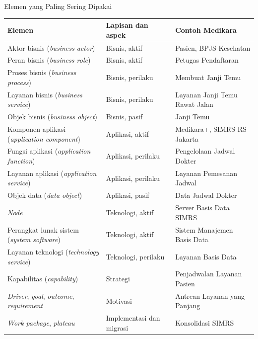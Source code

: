 \documentclass[aspectratio=169, table, 12pt]{beamer}
\begin{document}
\begin{frame}{{\Large Elemen yang Paling Sering Dipakai}}
  \scriptsize
  \begin{tabularx}{\textwidth}{>{\raggedright\arraybackslash}p{6.0cm}l
      >{\raggedright\arraybackslash}X}
    \hline
    \textbf{Elemen} & \textbf{Lapisan dan aspek} & \textbf{Contoh Medikara} \\
    \hline
    Aktor bisnis (\textit{business actor}) & Bisnis, aktif & Pasien, BPJS Kesehatan \\
    \hline
    Peran bisnis (\textit{business role}) & Bisnis, aktif & Petugas Pendaftaran \\
    \hline
    Proses bisnis (\textit{business process}) & Bisnis, perilaku & Membuat Janji Temu \\
    \hline
    Layanan bisnis (\textit{business service}) & Bisnis, perilaku & Layanan Janji Temu Rawat Jalan \\
    \hline
    Objek bisnis (\textit{business object}) & Bisnis, pasif & Janji Temu \\
    \hline
    Komponen aplikasi (\textit{application component}) & Aplikasi, aktif & Medikara+, SIMRS RS Jakarta \\
    \hline
    Fungsi aplikasi (\textit{application function}) & Aplikasi, perilaku & Pengelolaan Jadwal Dokter \\
    \hline
    Layanan aplikasi (\textit{application service}) & Aplikasi, perilaku & Layanan Pemesanan Jadwal \\
    \hline
    Objek data (\textit{data object}) & Aplikasi, pasif & Data Jadwal Dokter \\
    \hline
    \textit{Node} & Teknologi, aktif & Server Basis Data SIMRS \\
    \hline
    Perangkat lunak sistem (\textit{system software}) & Teknologi, aktif & Sistem Manajemen Basis Data \\
    \hline
    Layanan teknologi (\textit{technology service}) & Teknologi, perilaku & Layanan Basis Data \\
    \hline
    Kapabilitas (\textit{capability}) & Strategi & Penjadwalan Layanan Pasien \\
    \hline
    \textit{Driver}, \textit{goal}, \textit{outcome}, \textit{requirement} & Motivasi & Antrean Layanan yang Panjang \\
    \hline
    \textit{Work package}, \textit{plateau} & Implementasi dan migrasi & Konsolidasi SIMRS \\
    \hline
  \end{tabularx}
\end{frame}
\end{document}
